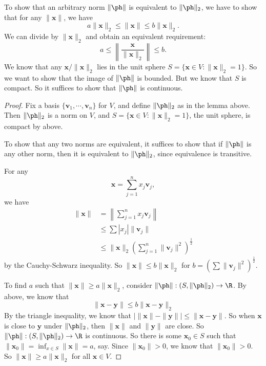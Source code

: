\documentclass[a4paper]{article}
\begin{document}
To show that an arbitrary norm $\|\ph\|$ is equivalent to $\|\ph\|_2$, we have to show that for any $\|\mathbf{x}\|$, we have
\[
  a \|\mathbf{x}\|_2 \leq \|\mathbf{x}\| \leq b\|\mathbf{x}\|_2.
\]
We can divide by $\|\mathbf{x}\|_2$ and obtain an equivalent requirement:
\[
  a \leq \left\|\frac{\mathbf{x}}{\|\mathbf{x}\|_2}\right\| \leq b.
\]
We know that any $\mathbf{x}/\|\mathbf{x}\|_2$ lies in the unit sphere $S = \{\mathbf{x} \in V: \|\mathbf{x}\|_2 = 1\}$. So we want to show that the image of $\|\ph\|$ is bounded. But we know that $S$ is compact. So it suffices to show that $\|\ph\|$ is continuous.
\begin{proof}
  Fix a basis $\{\mathbf{v}_1, \cdots, \mathbf{v}_n\}$ for $V$, and define $\|\ph\|_2$ as in the lemma above. Then $\|\ph\|_2$ is a norm on $V$, and $S = \{\mathbf{x} \in V: \|\mathbf{x}\|_2 = 1\}$, the unit sphere, is compact by above.

  To show that any two norms are equivalent, it suffices to show that if $\|\ph\|$ is any other norm, then it is equivalent to $\|\ph\|_2$, since equivalence is transitive.

  For any
  \[
    \mathbf{x} = \sum_{j = 1}^n x_j \mathbf{v}_j,
  \]
  we have
  \begin{align*}
    \|\mathbf{x}\| &= \left\|\sum_{j = 1}^n x_j \mathbf{v}_j\right\|\\
    &\leq \sum |x_j| \|\mathbf{v}_j\|\\
    &\leq \|\mathbf{x}\|_2 \left(\sum_{j = 1}^n \|\mathbf{v}_j\|^2\right)^{\frac{1}{2}}
  \end{align*}
  by the Cauchy-Schwarz inequality. So $\|\mathbf{x}\| \leq b\|\mathbf{x}\|_2$ for $b = \left(\sum \|\mathbf{v}_j\|^2\right)^{\frac{1}{2}}$.

  To find $a$ such that $\|\mathbf{x}\| \geq a\|\mathbf{x}\|_2$, consider $\|\ph\|: (S, \|\ph\|_2)\to \R$. By above, we know that
  \[
    \|\mathbf{x} - \mathbf{y}\| \leq b \|\mathbf{x} - \mathbf{y}\|_2
  \]
  By the triangle inequality, we know that $\big|\|\mathbf{x}\| - \|\mathbf{y}\|\big| \leq \|\mathbf{x} - \mathbf{y}\|$. So when $\mathbf{x}$ is close to $\mathbf{y}$ under $\|\ph\|_2$, then $\|\mathbf{x}\|$ and $\|\mathbf{y}\|$ are close. So $\|\ph\|: (S, \|\ph\|_2) \to \R$ is continuous. So there is some $\mathbf{x}_0 \in S$ such that $\|\mathbf{x}_0\| = \inf_{x \in S} \|\mathbf{x}\| = a$, say. Since $\|\mathbf{x}_0\| > 0$, we know that $\|\mathbf{x}_0\| > 0$. So $\|\mathbf{x}\| \geq a\|\mathbf{x}\|_2$  for all $\mathbf{x}\in V$.
\end{proof}
\end{document}
